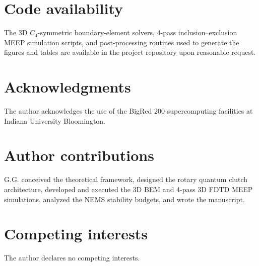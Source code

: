 \documentclass[11pt,letterpaper]{article}
\begin{document}
\section*{Code availability}
The 3D $C_4$-symmetric boundary-element solvers, 4-pass inclusion--exclusion MEEP simulation scripts, and post-processing routines used to generate the figures and tables are available in the project repository upon reasonable request.

\section*{Acknowledgments}
The author acknowledges the use of the BigRed 200 supercomputing facilities at Indiana University Bloomington.

\section*{Author contributions}
G.G. conceived the theoretical framework, designed the rotary quantum clutch architecture, developed and executed the 3D BEM and 4-pass 3D FDTD MEEP simulations, analyzed the NEMS stability budgets, and wrote the manuscript.

\section*{Competing interests}
The author declares no competing interests.



\end{document}
